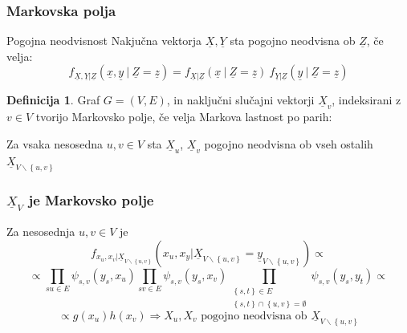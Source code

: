 \documentclass{beamer}
\renewcommand{\vec}{\underline}
\theoremstyle{definition}
\newtheorem{definicija}{Definicija}
\begin{document}
	\begin{frame}
		\frametitle{Markovska polja}
		\begin{block}{Pogojna neodvisnost}
			Nakjučna vektorja $\vec{X}, \vec{Y}$ sta pogojno
			neodvisna ob $\vec{Z}$, če velja:
			$$f_{\vec{X}, \vec{Y}|\vec{Z}}\left(\vec{x}, \vec{y}\ |\ \vec{Z} = \vec{z}\right) =
			f_{\vec{X}|\vec{Z}}\left(\vec{x}\ |\ \vec{Z} = \vec{z}\right) \
			f_{\vec{Y}|\vec{Z}}\left(\vec{y}\ |\ \vec{Z} = \vec{z}\right)
			$$
		\end{block}
		\pause
		\begin{definicija}
			Graf $G = \left(V, E\right)$, in naključni slučajni vektorji
			$\vec{X}_v$, indeksirani z $v \in V$ tvorijo Markovsko polje,
			če velja Markova lastnost po parih:

			Za vsaka nesosedna $u, v \in V$ sta $\vec{X}_u$, $\vec{X}_v$
			pogojno neodvisna ob vseh ostalih
			$\vec{X}_{V\backslash\left\{u, v\right\}}$
		\end{definicija}
	\end{frame}

	\begin{frame}
		\frametitle{$\vec{X}_V$ je Markovsko polje}
		Za nesosednja $u, v \in V$ je
		$$
		f_{x_u,x_v|\vec{X}_{V\backslash \left\{u,v\right\}}}
			\left(x_u,x_y | \vec{X}_{V\backslash \left\{u,v\right\}} = \vec{y}_{V\backslash \left\{u,v\right\}}\right) \propto
		$$
		\pause
		$$
		\propto \prod_{su \in E}\psi_{s,v}\left(y_s,x_u\right)
			\prod_{sv \in E}\psi_{s,v}\left(y_s,x_v\right)
			\prod_{\substack{\left\{s,t\right\} \in E \\ \left\{s,t\right\}\cap \left\{u,v\right\} = \emptyset}}\psi_{s,v}\left(y_s,y_t\right)
			\propto
		$$
		\pause
		$$
		\propto g\left(x_u\right) h\left(x_v\right) \Rightarrow X_u, X_v \text{ pogojno neodvisna ob } \vec{X}_{V\backslash \left\{u,v\right\}}
		$$
	\end{frame}
\end{document}
